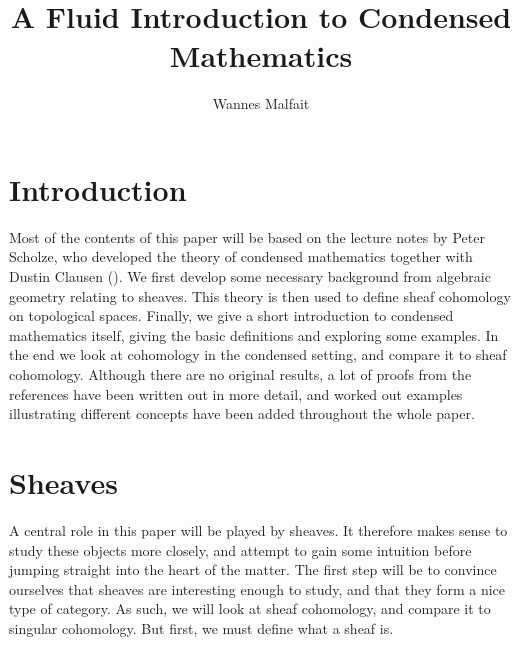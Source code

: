 \documentclass{article}
\title{A Fluid Introduction to Condensed Mathematics}
\author{Wannes Malfait}
\date{}
\begin{document}
\maketitle
\newpage
\tableofcontents

\section{Introduction}
Most of the contents of this paper will be based on the lecture
notes by Peter Scholze, who developed the theory of condensed mathematics
together with Dustin Clausen (\cite{Sch2019LecturesCM}).
We first develop some necessary background from algebraic geometry
relating to sheaves. This theory is then used to define sheaf
cohomology on topological spaces. Finally, we give a short
introduction to condensed mathematics itself, giving the basic
definitions and exploring some examples. In the end we look
at cohomology in the condensed setting, and compare it to sheaf
cohomology. Although there are no original results, a lot of proofs
from the references have been written out in more detail, and
worked out examples illustrating different concepts have been
added throughout the whole paper.

\section{Sheaves}
A central role in this paper will be played by sheaves.
It therefore makes sense to study these objects more closely,
and attempt to gain some intuition before jumping straight into
the heart of the matter.
The first step will be to convince ourselves that sheaves
are interesting enough to study, and that they form a nice type
of category. As such, we will look at sheaf cohomology,
and compare it to singular cohomology. But first, we must
define what a sheaf is.
\end{document}
